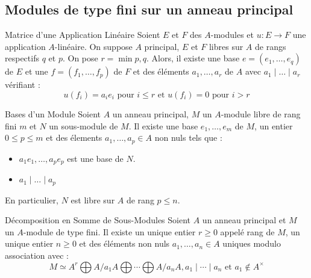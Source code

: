 \documentclass{cours}
\begin{document}
\subsection{Modules de type fini sur un anneau principal}
\begin{théorème}{Matrice d'une Application Linéaire}{}
    Soient $E$ et $F$ des $A$-modules et $u : E \to F$ une application $A$-linéaire. On suppose $A$ principal, $E$ et $F$ libres sur $A$ de rangs respectifs $q$ et $p$. On pose $r = \min p, q$.
    Alors, il existe une base $e = \left(e_{1},\ldots, e_{q}\right)$ de $E$ et une $f = \left(f_{1}, \ldots, f_{p}\right)$ de $F$ et des éléments $a_{1}, \ldots, a_{r}$ de $A$ avec $a_{1} \mid \ldots \mid a_{r}$ vérifiant :
    \[
        u(f_{i}) = a_{i}e_{i} \text{ pour } i \leq r \text{ et } u(f_{i}) = 0 \text{ pour } i > r
    \]
\end{théorème}

\begin{théorème}{Bases d'un Module}{}
    Soient $A$ un anneau principal, $M$ un $A$-module libre de rang fini $m$ et $N$ un sous-module de $M$. Il existe une base $e_{1}, \ldots, e_{m}$ de $M$, un entier $0 \leq p \leq m$ et des élements $a_{1}, \ldots, a_{p} \in A$ non nuls tels que :
    \begin{itemize}
        \item $a_{1}e_{1}, \ldots, a_{p}e_{p}$ est une base de $N$.
        \item $a_{1} \mid \ldots \mid a_{p}$
    \end{itemize}
    En particulier, $N$ est libre sur $A$ de rang $p \leq n$.
\end{théorème}

\begin{théorème}{Décomposition en Somme de Sous-Modules}{}
    Soient $A$ un anneau principal et $M$ un $A$-module de type fini. Il existe un unique entier $r \geq 0$ appelé rang de $M$, un unique entier $n \geq 0$ et des éléments non nuls $a_{1}, \ldots, a_{n} \in A$ uniques modulo association avec :
    \[
        M \simeq A^{r} \bigoplus A/a_{1}A \bigoplus \cdots \bigoplus A/a_{n}A, a_{1} \mid \cdots \mid a_{n} \text{ et } a_{1} \notin A^{\times}
    \]
\end{théorème}
\end{document}
